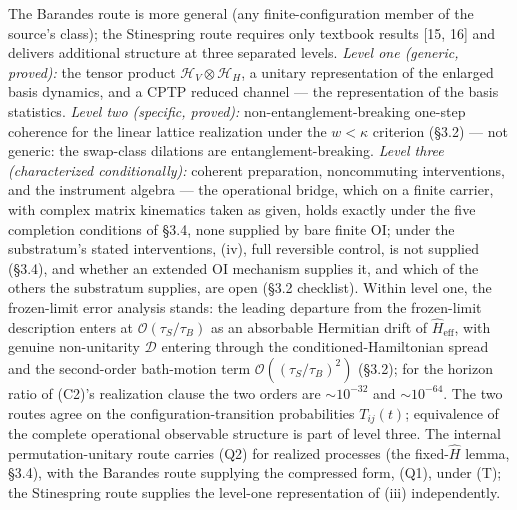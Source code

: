 \documentclass[
]{article}
\begin{document}
The Barandes route is more general (any finite-configuration member of
the source's class); the Stinespring route requires only textbook
results {[}15, 16{]} and delivers additional structure at three
separated levels. \emph{Level one (generic, proved):} the tensor product
\(\mathcal{H}_V \otimes \mathcal{H}_H\), a unitary representation of the
enlarged basis dynamics, and a CPTP reduced channel --- the
representation of the basis statistics. \emph{Level two (specific,
proved):} non-entanglement-breaking one-step coherence for the linear
lattice realization under the \(w < \kappa\) criterion (§3.2) --- not
generic: the swap-class dilations are entanglement-breaking. \emph{Level
three (characterized conditionally):} coherent preparation, noncommuting
interventions, and the instrument algebra --- the operational bridge,
which on a finite carrier, with complex matrix kinematics taken as
given, holds exactly under the five completion conditions of §3.4, none
supplied by bare finite OI; under the substratum's stated interventions,
(iv), full reversible control, is not supplied (§3.4), and whether an
extended OI mechanism supplies it, and which of the others the
substratum supplies, are open (§3.2 checklist). Within level one, the
frozen-limit error analysis stands: the leading departure from the
frozen-limit description enters at \(\mathcal{O}(\tau_S/\tau_B)\) as an
absorbable Hermitian drift of \(\hat{H}_{\text{eff}}\), with genuine
non-unitarity \(\mathcal{D}\) entering through the
conditioned-Hamiltonian spread and the second-order bath-motion term
\(\mathcal{O}((\tau_S/\tau_B)^2)\) (§3.2); for the horizon ratio of
(C2)'s realization clause the two orders are \(\sim 10^{-32}\) and
\(\sim 10^{-64}\). The two routes agree on the configuration-transition
probabilities \(T_{ij}(t)\); equivalence of the complete operational
observable structure is part of level three. The internal
permutation-unitary route carries (Q2) for realized processes (the
fixed-\(\hat{H}\) lemma, §3.4), with the Barandes route supplying the
compressed form, (Q1), under (T); the Stinespring route supplies the
level-one representation of (iii) independently.
\end{document}
